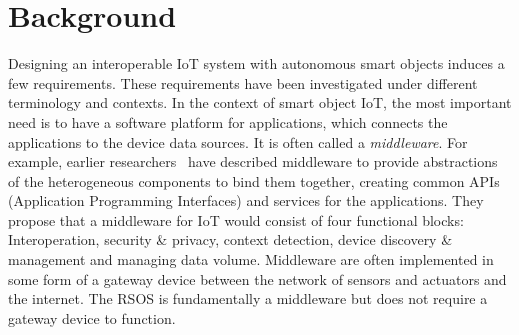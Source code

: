 \chapter{Background}
\label{chapter:background} 




Designing an interoperable IoT system with autonomous smart objects induces a few requirements. These requirements have been investigated under different terminology and contexts. In the context of smart object IoT, the most important need is to have a software platform for applications, which connects the applications to the device data sources. It is often called a \emph{middleware}. For example, earlier researchers~\cite{Role_Of_Middleware_For_Internet_Of_Things_A_Study} have described middleware to provide abstractions of the heterogeneous components to bind them together, creating common APIs (Application Programming Interfaces) and services for the applications. They propose that a middleware for IoT would consist of four functional blocks: Interoperation, security \& privacy, context detection, device discovery \& management and managing data volume. Middleware are often implemented in some form of a gateway device between the network of sensors and actuators and the internet. The RSOS is fundamentally a middleware but does not require a gateway device to function.



